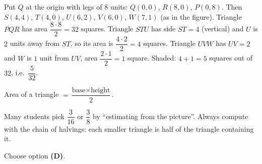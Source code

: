 {
Put $Q$ at the origin with legs of $8$ units: $Q(0,0)$, $R(8,0)$, $P(0,8)$. Then $S(4,4)$, $T(4,0)$, $U(6,2)$, $V(6,0)$, $W(7,1)$ (as in the figure). Triangle $PQR$ has area $\dfrac{8\cdot 8}{2}=32$ squares. Triangle $STU$ has side $ST=4$ (vertical) and $U$ is $2$ units away from $ST$, so its area is $\dfrac{4\cdot 2}{2}=4$ squares. Triangle $UVW$ has $UV=2$ and $W$ is $1$ unit from $UV$, area $\dfrac{2\cdot1}{2}=1$ square. Shaded: $4+1=5$ squares out of $32$, i.e.\ $\dfrac5{32}$.

\begin{recallbox}Area of a triangle $=\dfrac{\text{base}\times\text{height}}{2}$.\end{recallbox}

\begin{warnbox}Many students pick $\dfrac{3}{16}$ or $\dfrac38$ by ``estimating from the picture''. Always compute with the chain of halvings: each smaller triangle is half of the triangle containing it.\end{warnbox}

Choose option \textbf{(D)}.
}

